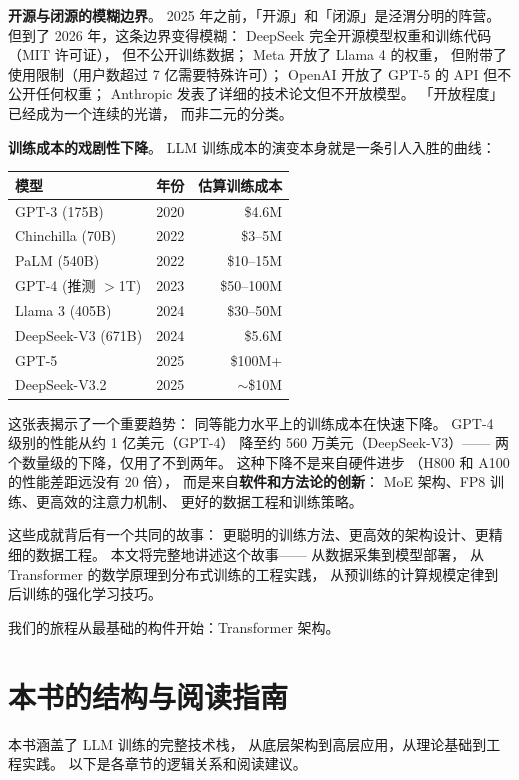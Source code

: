 \textbf{开源与闭源的模糊边界}。
2025 年之前，「开源」和「闭源」是泾渭分明的阵营。
但到了 2026 年，这条边界变得模糊：
DeepSeek 完全开源模型权重和训练代码（MIT 许可证），
但不公开训练数据；
Meta 开放了 Llama 4 的权重，
但附带了使用限制（用户数超过 7 亿需要特殊许可）；
OpenAI 开放了 GPT-5 的 API 但不公开任何权重；
Anthropic 发表了详细的技术论文但不开放模型。
「开放程度」已经成为一个连续的光谱，
而非二元的分类。

\textbf{训练成本的戏剧性下降}。
LLM 训练成本的演变本身就是一条引人入胜的曲线：
\begin{center}
\small
\begin{tabular}{lrr}
\hline
\textbf{模型} & \textbf{年份} & \textbf{估算训练成本} \\
\hline
GPT-3 (175B)      & 2020 & \$4.6M \\
Chinchilla (70B)  & 2022 & \$3--5M \\
PaLM (540B)       & 2022 & \$10--15M \\
GPT-4 (推测 $>$1T) & 2023 & \$50--100M \\
Llama 3 (405B)    & 2024 & \$30--50M \\
DeepSeek-V3 (671B)& 2024 & \$5.6M \\
GPT-5             & 2025 & \$100M+ \\
DeepSeek-V3.2     & 2025 & $\sim$\$10M \\
\hline
\end{tabular}
\end{center}

这张表揭示了一个重要趋势：
同等能力水平上的训练成本在快速下降。
GPT-4 级别的性能从约 1 亿美元（GPT-4）
降至约 560 万美元（DeepSeek-V3）——
两个数量级的下降，仅用了不到两年。
这种下降不是来自硬件进步
（H800 和 A100 的性能差距远没有 20 倍），
而是来自\textbf{软件和方法论的创新}：
MoE 架构、FP8 训练、更高效的注意力机制、
更好的数据工程和训练策略。

这些成就背后有一个共同的故事：
更聪明的训练方法、更高效的架构设计、更精细的数据工程。
本文将完整地讲述这个故事——
从数据采集到模型部署，
从 Transformer 的数学原理到分布式训练的工程实践，
从预训练的计算规模定律到后训练的强化学习技巧。

我们的旅程从最基础的构件开始：Transformer 架构。

\section{本书的结构与阅读指南}

本书涵盖了 LLM 训练的完整技术栈，
从底层架构到高层应用，从理论基础到工程实践。
以下是各章节的逻辑关系和阅读建议。

